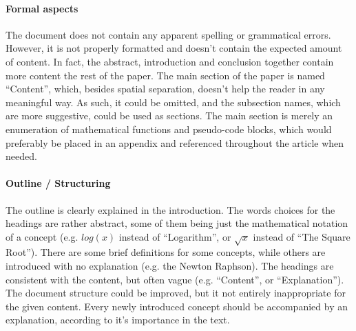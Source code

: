 \documentclass[12pt]{scrartcl}
\begin{document}
            
\paragraph{Formal aspects} The document does not contain any apparent spelling
or grammatical errors. However, it is not properly formatted and doesn't contain
the expected amount of content. In fact, the abstract, introduction and
conclusion together contain more content the rest of the paper. The main
section of the paper is named ``Content'', which, besides spatial separation,
doesn't help the reader in any meaningful way. As such, it could be omitted,
and the subsection names, which are more suggestive, could be used as sections.
The main section is merely an enumeration of mathematical functions and
pseudo-code blocks, which would preferably be placed in an appendix and
referenced throughout the article when needed.






\paragraph{Outline / Structuring} The outline is clearly explained in the
introduction. The words choices for the headings are rather abstract, some of
them being just the mathematical notation of a concept (e.g. $log(x)$ instead
of ``Logarithm'', or $\sqrt{x}$ instead of ``The Square Root''). There are some
brief definitions for some concepts, while others are introduced with no
explanation (e.g. the Newton Raphson). The headings are consistent with the
content, but often vague (e.g. ``Content'', or ``Explanation''). The document
structure could be improved, but it not entirely inappropriate for the given
content. Every newly introduced concept should be accompanied by an explanation,
according to it's importance in the text.
   


\end{document}
